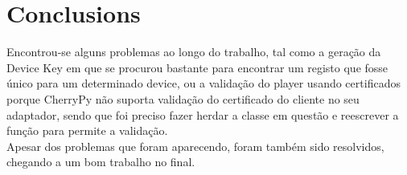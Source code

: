 \documentclass[11pt,a4paper]{report}
\begin{document}
\chapter{Conclusions}

Encontrou-se alguns problemas ao longo do trabalho, tal como a geração da Device Key em que se procurou bastante para encontrar um registo que fosse único para um determinado device, ou a validação do player usando certificados porque CherryPy não suporta validação do certificado do cliente no seu adaptador, sendo que foi preciso fazer herdar a classe em questão e reescrever a função para permite a validação.\\

Apesar dos problemas que foram aparecendo, foram também sido resolvidos, chegando a um bom trabalho no final. 





\end{document}

